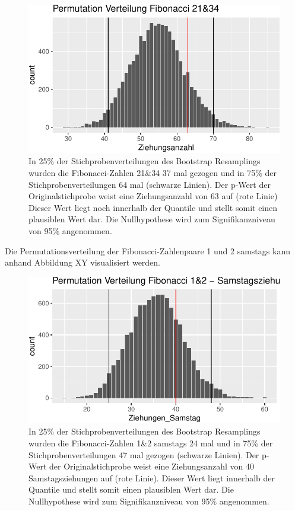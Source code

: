 \documentclass[ngerman,]{article}
\begin{document}
\begin{figure}

\includegraphics{Abbildung/Permut_21_34-1} \hfill{}

\caption{In 25\% der Stichprobenverteilungen des Bootstrap Resamplings wurden die Fibonacci-Zahlen 21\&34 37 mal gezogen und in 75\% der Stichprobenverteilungen 64 mal (schwarze Linien). Der p-Wert der Originalstichprobe weist eine Ziehungsanzahl von 63 auf (rote Linie) Dieser Wert liegt noch innerhalb der Quantile und stellt somit einen plausiblen Wert dar. Die Nullhypothese wird zum Signifikanzniveau von 95\% angenommen.}\label{fig:Permut_21_34}
\end{figure}

Die Permutationsverteilung der Fibonacci-Zahlenpaare 1 und 2 samstags
kann anhand Abbildung XY visualisiert werden.

\begin{figure}

\includegraphics{Abbildung/Permut_1_2sa-1} \hfill{}

\caption{In 25\% der Stichprobenverteilungen des Bootstrap Resamplings wurden die Fibonacci-Zahlen 1\&2 samstags 24 mal und in 75\% der Stichprobenverteilungen 47 mal gezogen (schwarze Linien). Der p-Wert der Originalstichprobe weist eine Ziehungsanzahl von 40 Samstagsziehungen auf (rote Linie). Dieser Wert liegt innerhalb der Quantile und stellt somit einen plausiblen Wert dar. Die Nullhypothese wird zum Signifikanzniveau von 95\% angenommen.}\label{fig:Permut_1_2sa}
\end{figure}
\end{document}
